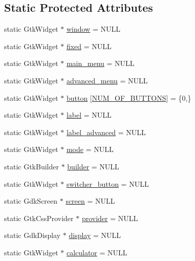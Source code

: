 \subsection*{Static Protected Attributes}
\begin{DoxyCompactItemize}
\item 
static Gtk\+Widget $\ast$ \mbox{\hyperlink{class_g_u_i_ae307bf43cbe1839cc5d849b916e0c27c}{window}} = N\+U\+LL
\item 
static Gtk\+Widget $\ast$ \mbox{\hyperlink{class_g_u_i_a71dba7d167bef1305da908de9f0eba80}{fixed}} = N\+U\+LL
\item 
static Gtk\+Widget $\ast$ \mbox{\hyperlink{class_g_u_i_a752852ce4ab08ffb3e14d510db6d9451}{main\+\_\+menu}} = N\+U\+LL
\item 
static Gtk\+Widget $\ast$ \mbox{\hyperlink{class_g_u_i_ac5c18505875e1951276cb6cbf6b8b53d}{advanced\+\_\+menu}} = N\+U\+LL
\item 
static Gtk\+Widget $\ast$ \mbox{\hyperlink{class_g_u_i_af57253dc8e8f22f62675d9e05972f189}{button}} \mbox{[}\mbox{\hyperlink{graphics_8h_ab076d40d6e2ef36100620d3d12ca54dd}{N\+U\+M\+\_\+\+O\+F\+\_\+\+B\+U\+T\+T\+O\+NS}}\mbox{]} = \{0,\}
\item 
static Gtk\+Widget $\ast$ \mbox{\hyperlink{class_g_u_i_ad2408a0ec1775ce2d112157ccac24af8}{label}} = N\+U\+LL
\item 
static Gtk\+Widget $\ast$ \mbox{\hyperlink{class_g_u_i_a4f2532f4151e5387f715efc462d8f24e}{label\+\_\+advanced}} = N\+U\+LL
\item 
static Gtk\+Widget $\ast$ \mbox{\hyperlink{class_g_u_i_a5f0b2e50665aec708c645d505ee32101}{mode}} = N\+U\+LL
\item 
static Gtk\+Builder $\ast$ \mbox{\hyperlink{class_g_u_i_aaf698841371f1491d0bba4257187c7b1}{builder}} = N\+U\+LL
\item 
static Gtk\+Widget $\ast$ \mbox{\hyperlink{class_g_u_i_a46b07a48ff0779e2a39d7c760849431f}{switcher\+\_\+button}} = N\+U\+LL
\item 
static Gdk\+Screen $\ast$ \mbox{\hyperlink{class_g_u_i_ac56be6803c5b398fc0ce30fb1fb23e47}{screen}} = N\+U\+LL
\item 
static Gtk\+Css\+Provider $\ast$ \mbox{\hyperlink{class_g_u_i_abd7af241445c2d978c1c5a2621761cda}{provider}} = N\+U\+LL
\item 
static Gdk\+Display $\ast$ \mbox{\hyperlink{class_g_u_i_a3c9c6eda274513cd9316a2d8bdc127b0}{display}} = N\+U\+LL
\item 
static Gtk\+Widget $\ast$ \mbox{\hyperlink{class_g_u_i_a5e8f3b867b0e1a6ecb2ce8b86281fae5}{calculator}} = N\+U\+LL

\end{DoxyCompactItemize}
